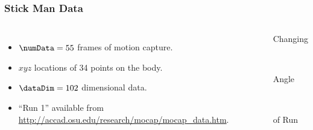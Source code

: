 \begin{frame}
  \frametitle{Stick Man Data}
  \begin{columns}
    \begin{itemize}
    \item $\numData=55$ frames of motion capture.
    \item $xyz$ locations of 34 points on the body.
    \item $\dataDim=102$ dimensional data.
    \item ``Run 1'' available from \url{http://accad.osu.edu/research/mocap/mocap_data.htm}.
    \end{itemize}


    \begin{center}
      \begin{minipage}[b][0.8\textheight][t]{0.5\columnwidth}%
        \begin{minipage}[c][0.3\textheight]{1\columnwidth}%
          \begin{center}
            Changing
          \end{center}%
        \end{minipage}\\
        \begin{minipage}[c][0.3\textheight]{1\columnwidth}%
          \begin{center}
            Angle
            \end{center}%
        \end{minipage}\\
        \begin{minipage}[c][0.3\textheight]{1\columnwidth}%
          \begin{center}
            of Run
            \end{center}%
        \end{minipage}%
      \end{minipage}
\end{center}
\end{columns}
\end{frame}
